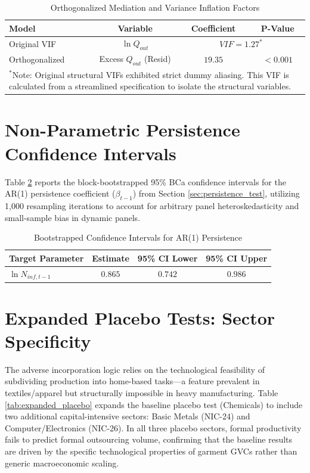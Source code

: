 \begin{table}[H]
	\centering
	\caption{Orthogonalized Mediation and Variance Inflation Factors}
	\label{tab:orthogonalization}
	\begin{tabular}{lccc}
		\toprule
		Model & Variable & Coefficient & P-Value \\
		\midrule
		Original VIF & $\ln Q_{out}$ & \multicolumn{2}{c}{$VIF = 1.27^{\ast}$} \\
		Orthogonalized & Excess $Q_{out}$ (Resid) & $19.35$ & $< 0.001$ \\
		\bottomrule
		\multicolumn{4}{p{0.9\textwidth}}{\footnotesize $^{\ast}$Note: Original structural VIFs exhibited strict dummy aliasing. This VIF is calculated from a streamlined specification to isolate the structural variables.}
	\end{tabular}
\end{table}

\section{Non-Parametric Persistence Confidence Intervals}

Table \ref{tab:bootstrap_persistence} reports the block-bootstrapped 95\% BCa confidence intervals for the AR(1) persistence coefficient ($\beta_{t-1}$) from Section \ref{sec:persistence_test}, utilizing 1,000 resampling iterations to account for arbitrary panel heteroskedasticity and small-sample bias in dynamic panels.

\begin{table}[H]
	\centering
	\caption{Bootstrapped Confidence Intervals for AR(1) Persistence}
	\label{tab:bootstrap_persistence}
	\begin{tabular}{lccc}
		\toprule
		Target Parameter & Estimate & 95\% CI Lower & 95\% CI Upper \\
		\midrule
		$\ln N_{inf, t-1}$ & $0.865$ & $0.742$ & $0.986$ \\
		\bottomrule
	\end{tabular}
\end{table}

\section{Expanded Placebo Tests: Sector Specificity}

The adverse incorporation logic relies on the technological feasibility of subdividing production into home-based tasks—a feature prevalent in textiles/apparel but structurally impossible in heavy manufacturing. Table \ref{tab:expanded_placebo} expands the baseline placebo test (Chemicals) to include two additional capital-intensive sectors: Basic Metals (NIC-24) and Computer/Electronics (NIC-26). In all three placebo sectors, formal productivity fails to predict formal outsourcing volume, confirming that the baseline results are driven by the specific technological properties of garment GVCs rather than generic macroeconomic scaling.

\begin{table}[H]
	\centering
	
\end{table}
